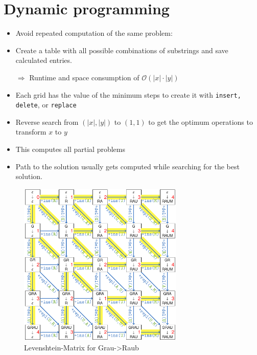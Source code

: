 \documentclass[12pt, a4paper]{scrartcl}
\newcommand{\bigO}{\mathcal{O}}
\renewcommand{\implies}{\Rightarrow}
\begin{document}
\section{Dynamic programming}
\label{sec:dynamic_programming}
\begin{itemize}
\item Avoid repeated computation of the same problem:
\item Create a table with all possible combinations of substrings and save calculated entries.
\item[$\implies$] Runtime and space consumption of $\bigO(|x|\cdot |y|)$
\item Each grid has the value of the minimum steps to create it with \texttt{insert, delete}, or \texttt{replace}
\item Reverse search from $(|x|,|y|)$ to $(1,1)$ to get the optimum operations to transform $x$ to $y$
\item This computes all partial problems
\item Path to the solution usually gets computed while searching for the best solution.%
\end{itemize}
\begin{figure}[!htbp]
  \centering
  \includegraphics[width=0.7\textwidth]{levenshtein_matrix}
  \caption{Levenshtein-Matrix for Grau->Raub}
  \label{fig:levenshtein}
\end{figure}
\end{document}
